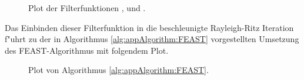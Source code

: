 \begin{figure}[h!]
\centering


\caption{Plot der Filterfunktionen ,  und .}\label{fig:chap5:ratFun}
\end{figure}

Das Einbinden dieser Filterfunktion in die beschleunigte Rayleigh-Ritz Iteration f"uhrt zu der in Algorithmus \ref{alg:appAlgorithm:FEAST} vorgestellten Umsetzung des FEAST-Algorithmus mit folgendem Plot.

\begin{figure}[h!]
\centering


\caption{Plot von Algorithmus \ref{alg:appAlgorithm:FEAST}.}\label{fig:chap5:feast}
\end{figure}

